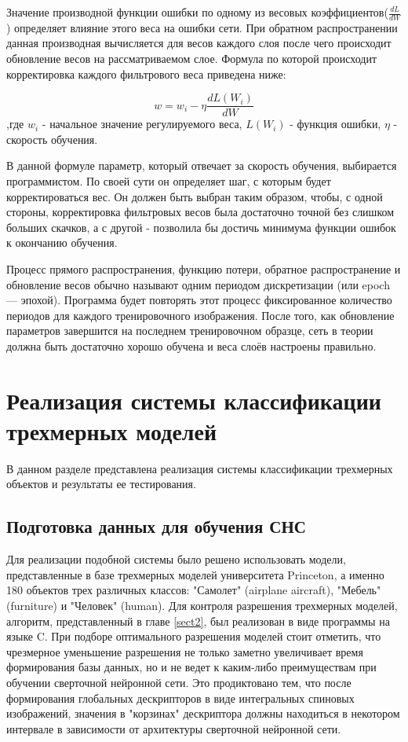 \documentclass[14pt]{article}
\numberwithin{figure}{section}
\numberwithin{equation}{section}
\begin{document}
Значение производной функции ошибки по одному из весовых коэффициентов($\frac{dL}{dW}$) определяет влияние этого веса на ошибки сети. При обратном распространении данная производная вычисляется для весов каждого слоя после чего происходит обновление весов на рассматриваемом слое. Формула по которой происходит корректировка каждого фильтрового веса приведена ниже:

\begin{equation}
    w = w_i - \eta\frac{dL(W_i)}{dW}
\end{equation}
,где $w_i$ - начальное значение регулируемого веса, $L(W_i)$ - функция ошибки, $\eta$ - скорость обучения.

В данной формуле параметр, который отвечает за скорость обучения, выбирается программистом. По своей сути он определяет шаг, с которым будет корректироваться вес. Он должен быть выбран таким образом, чтобы, с одной стороны, корректировка фильтровых весов была достаточно точной без слишком больших скачков, а с другой - позволила бы достичь минимума функции ошибок к окончанию обучения.

Процесс прямого распространения, функцию потери, обратное распространение и обновление весов обычно называют одним периодом дискретизации (или epoch — эпохой). Программа будет повторять этот процесс фиксированное количество периодов для каждого тренировочного изображения. После того, как обновление параметров завершится на последнем тренировочном образце, сеть в теории должна быть достаточно хорошо обучена и веса слоёв настроены правильно.

\newpage

\section{Реализация системы классификации трехмерных моделей}

В данном разделе представлена реализация системы классификации трехмерных объектов и результаты ее тестирования.

\subsection{Подготовка данных для обучения СНС}

Для реализации подобной системы было решено использовать модели, представленные в базе трехмерных моделей университета Princeton, а именно 180 объектов трех различных классов: "Самолет" (airplane aircraft), "Мебель" (furniture) и "Человек" (human). Для контроля разрешения трехмерных моделей, алгоритм, представленный в главе \ref{sect2}, был реализован в виде программы на языке C. При подборе оптимального разрешения моделей стоит отметить, что чрезмерное уменьшение разрешения не только заметно увеличивает время формирования базы данных, но и не ведет к каким-либо преимуществам при обучении сверточной нейронной сети. Это продиктовано тем, что после формирования глобальных дескрипторов в виде интегральных спиновых изображений, значения в "корзинах" дескриптора должны находиться в некотором интервале в зависимости от архитектуры сверточной нейронной сети.
\end{document}
